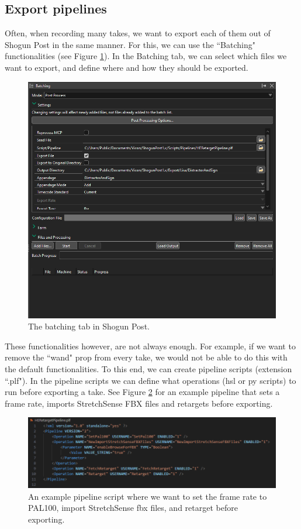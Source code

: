 \documentclass{uva-inf-article}
\begin{document}
\subsection{Export pipelines}
Often, when recording many takes, we want to export each of them out of Shogun Post in the same manner. For this, we can use the ``Batching" functionalities (see Figure \ref{fig:batching}). In the Batching tab, we can select which files we want to export, and define where and how they should be exported. 
\begin{figure}[hbt!]
    \centering
    \includegraphics[width=\textwidth]{imgs/Batching.png}
    \caption{The batching tab in Shogun Post.}
    \label{fig:batching}
\end{figure}

These functionalities however, are not always enough. For example, if we want to remove the ``wand" prop from every take, we would not be able to do this with the default functionalities. To this end, we can create pipeline scripts (extension ``.plf"). In the pipeline scripts we can define what operations (hsl or py scripts) to run before exporting a take. See Figure \ref{fig:pipelineHE} for an example pipeline that sets a frame rate, imports StretchSense FBX files and retargets before exporting.
\begin{figure}[hbt!]
    \centering
    \includegraphics[width=\textwidth]{imgs/pipelineHE.png}
    \caption{An example pipeline script where we want to set the frame rate to PAL100, import StretchSense fbx files, and retarget before exporting.}
    \label{fig:pipelineHE}
\end{figure}
\end{document}
